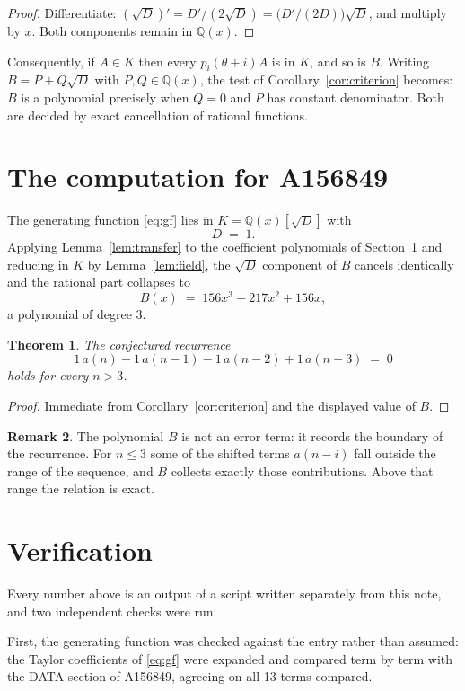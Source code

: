 \documentclass[11pt,a4paper]{article}
\theoremstyle{plain}
\newtheorem{theorem}{Theorem}
\theoremstyle{definition}
\newtheorem{remark}[theorem]{Remark}
\begin{document}
\begin{proof}
Differentiate: $(\sqrt{D})'=D'/(2\sqrt{D})=\bigl(D'/(2D)\bigr)\sqrt{D}$, and multiply by
$x$. Both components remain in $\mathbb{Q}(x)$.
\end{proof}

Consequently, if $A\in K$ then every $p_{i}(\theta+i)A$ is in $K$, and so is $B$. Writing
$B=P+Q\sqrt{D}$ with $P,Q\in\mathbb{Q}(x)$, the test of Corollary~\ref{cor:criterion}
becomes: $B$ is a polynomial precisely when $Q=0$ and $P$ has constant denominator. Both
are decided by exact cancellation of rational functions.

\section{The computation for A156849}

The generating function \eqref{eq:gf} lies in $K=\mathbb{Q}(x)[\sqrt{D}]$ with
\[
D \;=\; 1 .
\]
Applying Lemma~\ref{lem:transfer} to the coefficient polynomials of Section~1 and reducing
in $K$ by Lemma~\ref{lem:field}, the $\sqrt{D}$ component of $B$ cancels identically and
the rational part collapses to
\[
B(x)\;=\;156 x^{3} + 217 x^{2} + 156 x ,
\]
a polynomial of degree $3$.

\begin{theorem}
The conjectured recurrence
\[
1\,a(n) - 1\,a(n-1) - 1\,a(n-2) + 1\,a(n-3) \;=\;0
\]
holds for every $n>3$.
\end{theorem}

\begin{proof}
Immediate from Corollary~\ref{cor:criterion} and the displayed value of $B$.
\end{proof}

\begin{remark}
The polynomial $B$ is not an error term: it records the boundary of the recurrence. For
$n\le3$ some of the shifted terms $a(n-i)$ fall outside the range of the sequence,
and $B$ collects exactly those contributions. Above that range the relation is exact.
\end{remark}

\section{Verification}

Every number above is an output of a script written separately from this note, and two
independent checks were run.

First, the generating function was checked against the entry rather than assumed: the
Taylor coefficients of \eqref{eq:gf} were expanded and compared term by term with the DATA
section of A156849, agreeing on all 13 terms compared.
\end{document}

